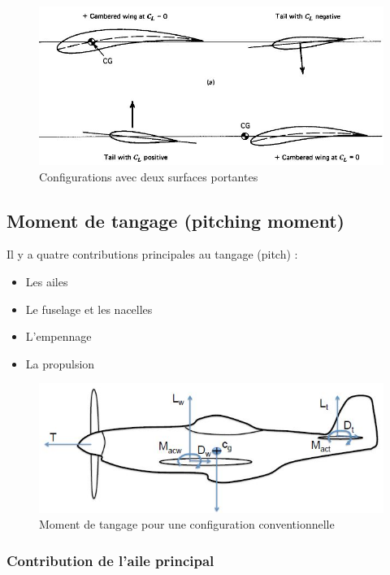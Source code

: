 \documentclass{report}
\begin{document}
\begin{figure}[h!]
    \centering
    \includegraphics[scale=0.7]{20.JPG}
    \caption{Configurations avec deux surfaces portantes}
    \label{20}
\end{figure}

\subsection{Moment de tangage (pitching moment)}

Il y a quatre contributions principales au tangage (pitch) :
\begin{itemize}
    \item Les ailes
    \item Le fuselage et les nacelles
    \item L'empennage
    \item La propulsion
\end{itemize}

 \begin{figure}[h!]
     \centering
     \includegraphics[scale=0.7]{21.JPG}
     \caption{Moment de tangage pour une configuration conventionnelle}
     \label{21}
 \end{figure}

\subsubsection{Contribution de l'aile principal}
\end{document}
